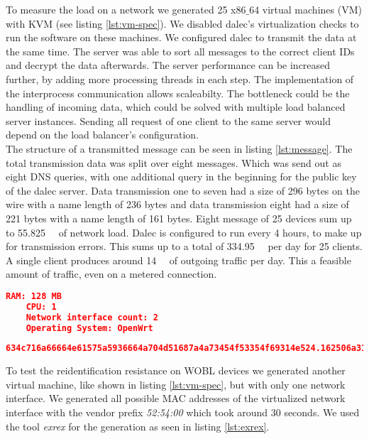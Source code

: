     To measure the load on a network we generated 25 x86$\_$64 virtual machines (VM) with KVM (see listing \ref{lst:vm-spec}). We disabled dalec's virtualization checks to run the software on these machines. We configured dalec to transmit the data at the same time. The server was able to sort all messages to the correct client IDs and decrypt the data afterwards. The server performance can be increased further, by adding more processing threads in each step. The implementation of the interprocess communication allows scaleabilty. The bottleneck could be the handling of incoming data, which could be solved with multiple load balanced server instances. Sending all request of one client to the same server would depend on the load balancer's configuration.\\
    The structure of a transmitted message can be seen in listing \ref{lst:message}. The total transmission data was split over eight messages.
    Which was send out as eight DNS queries, with one additional query in the beginning for the public key of the dalec server.
    Data transmission one to seven had a size of 296 bytes on the wire with a name length of 236 bytes and data transmission eight had a size of 221 bytes with a name length of 161 bytes. Eight message of  25 devices sum up to \SIlist{55.825}{\kilo\byte} of network load. Dalec is configured to run every 4 hours, to make up for transmission errors. 
    This sums up to a total of \SIlist{334.95}{\kilo\byte} per day for 25 clients. 
    A single client produces around \SIlist{14}{\kilo\byte} of outgoing traffic per day.
    This a feasible amount of traffic, even on a metered connection.
    
    \begin{lstlisting}[language=json, caption=virtual machine specifications, label=lst:vm-spec]
    RAM: 128 MB
    CPU: 1
    Network interface count: 2
    Operating System: OpenWrt
    \end{lstlisting}

    \begin{lstlisting}[language=json, caption=Layout of dalec message, label=lst:message]
634c716a66664e61575a5936664a704d51687a4a73454f53354f69314e524.162506a310a636136794752496d36794c5352626a6a464d765532636f4835.7258694279492b6b714c65507138426667596a31382b597a756d544267643.EPfGiM9IJpDHQQMaItynBRlJpusUP0KA-7-8.owrt.sviks.de
    \end{lstlisting}    
    
    To test the reidentification resistance on WOBL devices we generated another virtual machine, like shown in listing \ref{lst:vm-spec}, but with only one network interface. 
    We generated all possible MAC addresses of the virtualized network interface with the vendor prefix \textit{52:54:00} which took around 30 seconds. We used the tool \textit{exrex} \cite{tauber_asciimooexrex_2021} for the generation as seen in listing \ref{lst:exrex}. 
    
